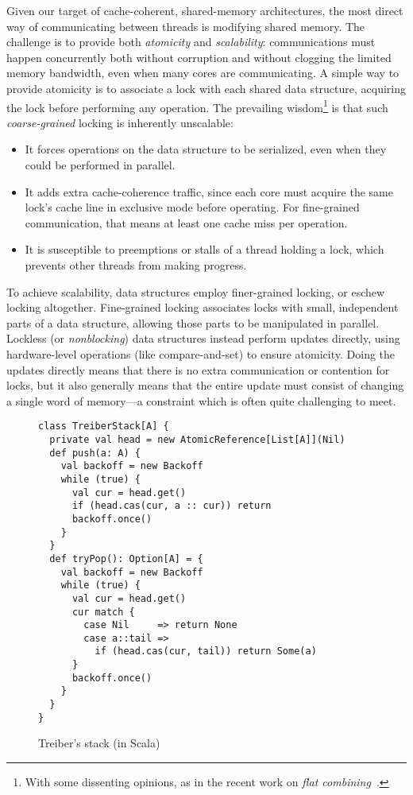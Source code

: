 \documentclass[preprint]{sigplanconf}
\begin{document}
Given our target of cache-coherent, shared-memory architectures, the
most direct way of communicating between threads is modifying shared
memory.  The challenge is to provide both \emph{atomicity} and
\emph{scalability}: communications must happen concurrently both
without corruption and without clogging the limited memory bandwidth,
even when many cores are communicating.  A simple way to provide
atomicity is to associate a lock with each shared data structure,
acquiring the lock before performing any operation.  The prevailing
wisdom\footnote{With some dissenting opinions, as in the recent work on
  \emph{flat combining}~\cite{Hendler2010}.} is
that such \emph{coarse-grained} locking is inherently unscalable:
\begin{itemize}
\item It forces operations on the data structure to be serialized,
  even when they could be performed in parallel.
\item It adds extra cache-coherence traffic, since each core must
  acquire the same lock's cache line in exclusive mode before
  operating.  For fine-grained communication, that means at least one
  cache miss per operation.
\item It is susceptible to preemptions or stalls of a
  thread holding a lock, which prevents other threads from making progress.
\end{itemize}

To achieve scalability, data structures employ finer-grained locking,
or eschew locking altogether.  Fine-grained locking associates locks
with small, independent parts of a data structure, allowing those
parts to be manipulated in parallel.  Lockless (or \emph{nonblocking})
data structures instead perform updates directly, using hardware-level
operations (like compare-and-set) to ensure atomicity.  Doing the
updates directly means that there is no extra communication or
contention for locks, but it also generally means that the entire
update must consist of changing a single word of memory---a constraint
which is often quite challenging to meet.

\begin{figure}
\begin{lstlisting}
class TreiberStack[A] {
  private val head = new AtomicReference[List[A]](Nil)
  def push(a: A) {
    val backoff = new Backoff
    while (true) {
      val cur = head.get()
      if (head.cas(cur, a :: cur)) return
      backoff.once()
    }
  }
  def tryPop(): Option[A] = {
    val backoff = new Backoff
    while (true) {
      val cur = head.get() 
      cur match {
        case Nil     => return None
        case a::tail => 
          if (head.cas(cur, tail)) return Some(a)
      }
      backoff.once()
    }
  }
}
\end{lstlisting}
\nocaptionrule
\caption{Treiber's stack (in Scala)}
\label{fig:classic-treiber}
\end{figure}
\end{document}
